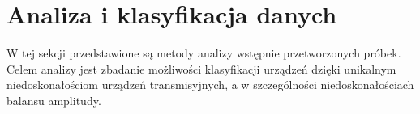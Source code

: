 


\section{Analiza i klasyfikacja danych}
W tej sekcji przedstawione są metody analizy wstępnie przetworzonych próbek. Celem analizy jest zbadanie możliwości klasyfikacji urządzeń dzięki unikalnym niedoskonałościom urządzeń transmisyjnych, a w szczególności niedoskonałościach balansu amplitudy.


